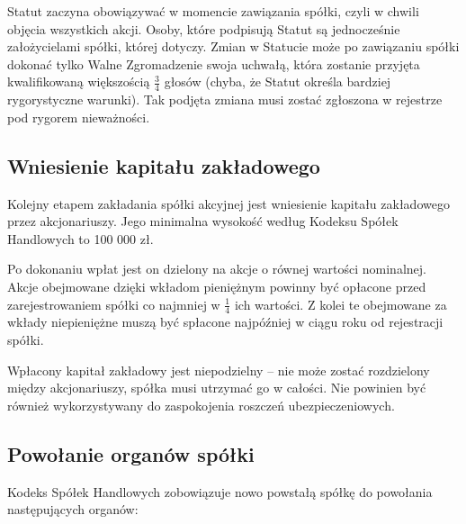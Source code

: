 \documentclass[11pt]{article}
\begin{document}
Statut zaczyna obowiązywać w momencie zawiązania spółki, czyli w chwili objęcia wszystkich akcji.
Osoby, które podpisują Statut są jednocześnie założycielami spółki, której dotyczy.
Zmian w Statucie może po zawiązaniu spółki dokonać tylko Walne Zgromadzenie swoja uchwałą, która zostanie przyjęta kwalifikowaną większością $\frac{3}{4}$ głosów (chyba, że Statut określa bardziej rygorystyczne warunki). Tak podjęta zmiana musi zostać zgłoszona w rejestrze pod rygorem nieważności.

\subsection{Wniesienie kapitału zakładowego}


	Kolejny etapem zakładania spółki akcyjnej jest wniesienie kapitału zakładowego przez akcjonariuszy. Jego minimalna wysokość według Kodeksu Spółek Handlowych to 100 000 zł.
	
	Po dokonaniu wpłat jest on dzielony na akcje o równej wartości nominalnej. Akcje obejmowane dzięki wkładom pieniężnym powinny być opłacone przed zarejestrowaniem spółki co najmniej w $\frac{1}{4}$ ich wartości. Z kolei te obejmowane za wkłady niepieniężne muszą być spłacone najpóźniej w ciągu roku od rejestracji spółki.
	
	Wpłacony kapitał zakładowy jest niepodzielny – nie może zostać rozdzielony między akcjonariuszy, spółka musi utrzymać go w całości. Nie powinien być również wykorzystywany do zaspokojenia roszczeń ubezpieczeniowych.
	
	\subsection{Powołanie organów spółki}
	Kodeks Spółek Handlowych zobowiązuje nowo powstałą spółkę do powołania następujących organów:
	
\end{document}
